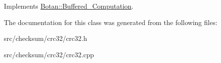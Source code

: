 Implements \hyperlink{classBotan_1_1Buffered__Computation_a7b2e6776ea9ded2e3f9da5a760b7d34b}{Botan\-::\-Buffered\-\_\-\-Computation}.



The documentation for this class was generated from the following files\-:\begin{DoxyCompactItemize}
\item 
src/checksum/crc32/crc32.\-h\item 
src/checksum/crc32/crc32.\-cpp\end{DoxyCompactItemize}
